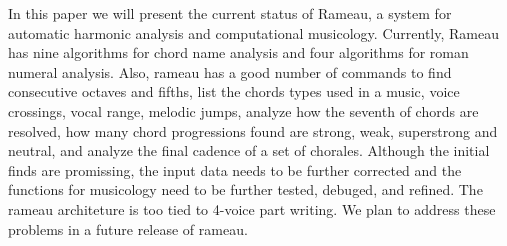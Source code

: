 In this paper we will present the current status of Rameau, a system
for automatic harmonic analysis and computational musicology.
Currently, Rameau has nine algorithms for chord name analysis and four
algorithms for roman numeral analysis. Also, rameau has a good number
of commands to find consecutive octaves and fifths, list the chords
types used in a music, voice crossings, vocal range, melodic jumps,
analyze how the seventh of chords are resolved, how many chord
progressions found are strong, weak, superstrong and neutral, and
analyze the final cadence of a set of chorales. Although the initial
finds are promissing, the input data needs to be further corrected and
the functions for musicology need to be further tested, debuged, and
refined. The rameau architeture is too tied to 4-voice part writing.
We plan to address these problems in a future release of rameau.

